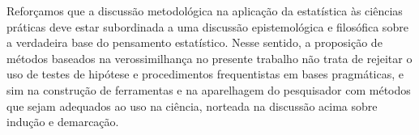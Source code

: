 Reforçamos que a discussão metodológica na aplicação da estatística às ciências práticas deve estar subordinada a uma discussão
epistemológica e filosófica sobre a verdadeira base do pensamento estatístico. Nesse sentido, a proposição de
métodos baseados na verossimilhança no presente trabalho não trata de rejeitar o uso de testes de hipótese 
e procedimentos frequentistas em
bases pragmáticas, e sim na construção de ferramentas e na aparelhagem do pesquisador com métodos que sejam
adequados ao uso na ciência, norteada na discussão acima sobre indução e demarcação.
 
